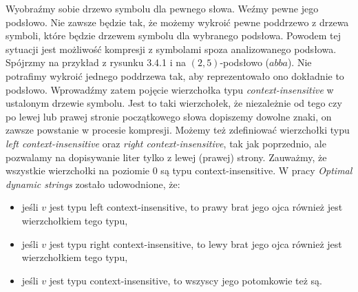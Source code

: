 \documentclass[declaration,shortabstract]{iithesis}
\theoremstyle{definition} \newtheorem{definition}{Definicja}[chapter]
\theoremstyle{remark} \newtheorem{remark}[definition]{Obserwacja}
\theoremstyle{plain} \newtheorem{theorem}[definition]{Twierdzenie}
\theoremstyle{remark} \newtheorem{example}{Przykład}[definition]
\theoremstyle{plain} \newtheorem{lemma}[definition]{Lemat}
\begin{document}
Wyobraźmy sobie drzewo symbolu dla pewnego słowa. Weźmy pewne jego podsłowo. Nie zawsze będzie tak, że możemy wykroić pewne poddrzewo z drzewa symboli, które będzie drzewem symbolu dla wybranego podsłowa. Powodem tej sytuacji jest możliwość kompresji z symbolami spoza analizowanego podsłowa. Spójrzmy na przykład z rysunku 3.4.1 i na $(2, 5)$-podsłowo ($abba$). Nie potrafimy wykroić jednego poddrzewa tak, aby reprezentowało ono dokładnie to podsłowo. Wprowadźmy zatem pojęcie wierzchołka typu \textit{context-insensitive} w ustalonym drzewie symbolu. Jest to taki wierzchołek, że niezależnie od tego czy po lewej lub prawej stronie początkowego słowa dopiszemy dowolne znaki, on zawsze powstanie w procesie kompresji. Możemy też zdefiniować wierzchołki typu \textit{left context-insensitive} oraz \textit{right context-insensitive}, tak jak poprzednio, ale pozwalamy na dopisywanie liter tylko z lewej (prawej) strony. Zauważmy, że wszystkie wierzchołki na poziomie $0$ są typu context-insensitive. W pracy \textit{Optimal dynamic strings} zostało udowodnione, że:
\begin{itemize}
    \item jeśli $v$ jest typu left context-insensitive, to prawy brat jego ojca również jest wierzchołkiem tego typu,
    \item jeśli $v$ jest typu right context-insensitive, to lewy brat jego ojca również jest wierzchołkiem tego typu,
    \item jeśli $v$ jest typu context-insensitive, to wszyscy jego potomkowie też są.
\end{itemize}
\end{document}
